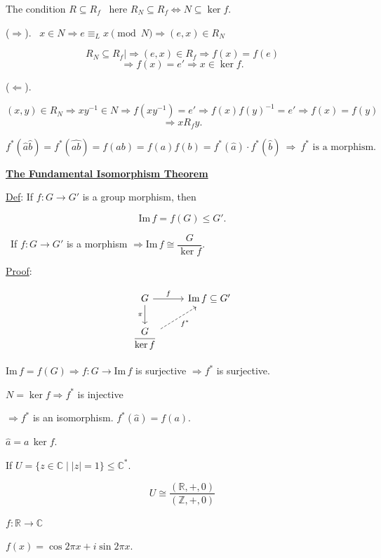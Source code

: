 \noindent The condition $R\subseteq R_f$ \ here $R_N\subseteq R_f \Leftrightarrow N\subseteq\ker f$.

\bigskip
\noindent ($\Rightarrow$). \ $x\in N \Rightarrow e\equiv_L x \pmod N \Rightarrow (e,x)\in R_N$

\[
R_N\subseteq R_f \Big| \Rightarrow (e,x)\in R_f \Rightarrow f(x)=f(e)
\]
\[
\Rightarrow f(x)=e' \Rightarrow x\in\ker f.
\]

\bigskip
\noindent ($\Leftarrow$).

\[
(x,y)\in R_N \Rightarrow xy^{-1}\in N \Rightarrow f(xy^{-1})=e' \Rightarrow f(x)f(y)^{-1}=e' \Rightarrow f(x)=f(y)
\]
\[
\Rightarrow xR_fy.
\]

\bigskip
\noindent $f^*(\hat a\hat b) = f^*(\widehat{ab}) = f(ab) = f(a)f(b) = f^*(\hat a)\cdot f^*(\hat b) \ \Rightarrow \ f^*\text{ is a morphism.}$

\bigskip
\begin{center}
\underline{\textbf{The Fundamental Isomorphism Theorem}}
\end{center}

\noindent\underline{Def}: If $f:G\to G'$ is a group morphism, then

\[
\text{Im}\,f = f(G) \leq G'.
\]

\bigskip
\noindent{} \ If $f:G\to G'$ is a morphism $\Rightarrow \text{Im}\,f \cong \dfrac{G}{\ker f}$.

\bigskip
\noindent\underline{Proof}:

\[
\begin{tikzcd}
G \arrow[r,"f"] \arrow[d,"\pi"'] & \text{Im}\,f \subseteq G' \\
\dfrac{G}{\ker f} \arrow[ur, dashed,"f^*"'] &
\end{tikzcd}
\]

\bigskip
\noindent $\text{Im}\,f=f(G) \Rightarrow f:G\to\text{Im}\,f$ is surjective $\Rightarrow f^*$ is surjective.

\noindent $N=\ker f \Rightarrow f^*$ is injective

\noindent $\Rightarrow f^*$ is an isomorphism. \quad $f^*(\hat a) = f(a)$.

\noindent $\hat a = a\,\ker f$.

\bigskip
\noindent If $U=\{z\in\mathbb{C} \mid |z|=1\} \leq \mathbb{C}^*$.

\[
U \cong \frac{(\mathbb{R},+,0)}{(\mathbb{Z},+,0)}
\]

\noindent $f:\mathbb{R}\to\mathbb{C}$

\noindent $f(x) = \cos 2\pi x + i\sin 2\pi x$.



